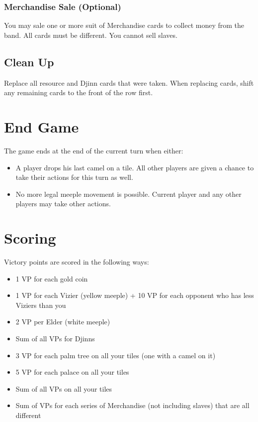 \documentclass[12pt]{article}
\newenvironment{itemizeCustom}
{\begin{itemize}
  \setlength{\itemsep}{1pt}
  \setlength{\parskip}{0pt}
  \setlength{\parsep}{0pt}}
{\end{itemize}}
\begin{document}
\begin{multicols*}{2}
\subsubsection*{Merchandise Sale (Optional)}
You may sale one or more suit of Merchandise cards to collect money from the band. All cards must be different. You cannot sell slaves.

\subsection*{Clean Up}
Replace all resource and Djinn cards that were taken. When replacing cards, shift any remaining cards to the front of the row first.

\section*{End Game}
The game ends at the end of the current turn when either:
\begin{itemizeCustom}
    \item A player drops his last camel on a tile. All other players are given a chance to take their actions for this turn as well.
    \item No more legal meeple movement is possible. Current player and any other players may take other actions.
\end{itemizeCustom}

\section*{Scoring}
Victory points are scored in the following ways:
\begin{itemizeCustom}
    \item 1 VP for each gold coin
    \item 1 VP for each Vizier (yellow meeple) + 10 VP for each opponent who has less Viziers than you
    \item 2 VP per Elder (white meeple)
    \item Sum of all VPs for Djinns
    \item 3 VP for each palm tree on all your tiles (one with a camel on it)
    \item 5 VP for each palace on all your tiles
    \item Sum of all VPs on all your tiles
    \item Sum of VPs for each series of Merchandise (not including slaves) that are all different
\end{itemizeCustom}

\end{multicols*}
\end{document}
